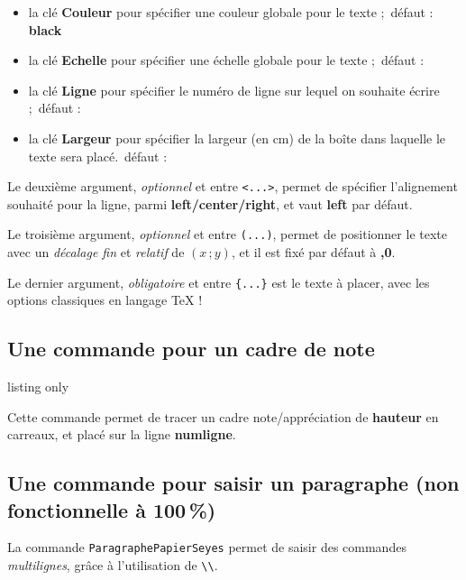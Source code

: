 \documentclass[a4paper]{article}
\newcommand\Cle[1]{{\bfseries\sffamily\textlangle #1\textrangle}}
\begin{document}
\begin{itemize}
	\item la clé \Cle{Couleur} pour spécifier une couleur globale pour le texte ;\hfill~défaut : \Cle{black}
	\item la clé \Cle{Echelle} pour spécifier une échelle globale pour le texte ;\hfill~défaut : \Cle{1}
	\item la clé \Cle{Ligne} pour spécifier le numéro de ligne sur lequel on souhaite écrire ;\hfill~défaut : \Cle{1}
	\item la clé \Cle{Largeur} pour spécifier la largeur (en cm) de la boîte dans laquelle le texte sera placé.\hfill~défaut : \Cle{16.8}
\end{itemize}

Le deuxième argument, \textit{optionnel} et entre \texttt{<...>}, permet de spécifier l'alignement souhaité pour la ligne, parmi \Cle{left/center/right}, et vaut \Cle{left} par défaut.

\smallskip

Le troisième argument, \textit{optionnel} et entre \texttt{(...)}, permet de positionner le texte avec un \textit{décalage fin} et \textit{relatif} de $(x\,;y)$, et il est fixé par défaut à \Cle{0,0}.

\smallskip

Le dernier argument, \textit{obligatoire} et entre \texttt{\{...\}} est le texte à placer, avec les options classiques en langage \TeX{} !

\subsection{Une commande pour un cadre de note}

\begin{PresentationCode}{listing only}
\end{PresentationCode}

Cette commande permet de tracer un cadre \textsf{note/appréciation} de \Cle{hauteur} en carreaux, et placé sur la ligne \Cle{numligne}.

\pagebreak

\subsection{Une commande pour saisir un paragraphe (non fonctionnelle à 100\,\%)}

La commande \texttt{ParagraphePapierSeyes} permet de saisir des commandes \textit{multilignes}, grâce à l'utilisation de \texttt{\textbackslash\textbackslash}.
\end{document}
